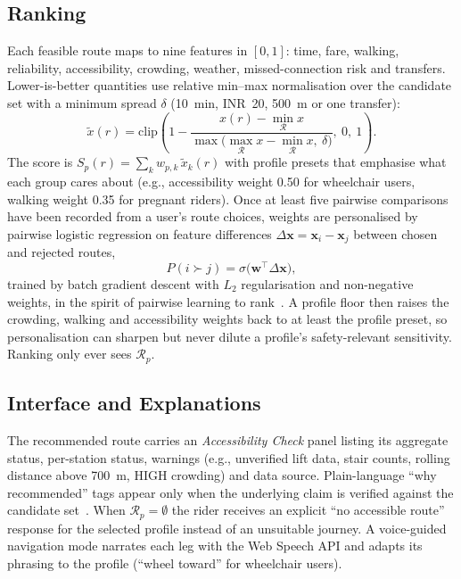 \documentclass[conference]{IEEEtran}
\begin{document}
\subsection{Ranking}
Each feasible route maps to nine features in $[0,1]$: time, fare, walking, reliability, accessibility, crowding, weather, missed-connection risk and transfers. Lower-is-better quantities use relative min--max normalisation over the candidate set with a minimum spread $\delta$ (10~min, INR~20, 500~m or one transfer):
\begin{equation}
\tilde{x}(r) = \mathrm{clip}\!\left(1 - \frac{x(r) - \min_{\mathcal{R}} x}{\max\bigl(\max_{\mathcal{R}} x - \min_{\mathcal{R}} x,\ \delta\bigr)},\ 0,\ 1\right).
\label{eq:norm}
\end{equation}
The score is $S_p(r) = \sum_k w_{p,k}\,\tilde{x}_k(r)$ with profile presets that emphasise what each group cares about (e.g., accessibility weight 0.50 for wheelchair users, walking weight 0.35 for pregnant riders). Once at least five pairwise comparisons have been recorded from a user's route choices, weights are personalised by pairwise logistic regression on feature differences $\Delta\mathbf{x} = \mathbf{x}_i - \mathbf{x}_j$ between chosen and rejected routes,
\begin{equation}
P(i \succ j) = \sigma\bigl(\mathbf{w}^{\top}\Delta\mathbf{x}\bigr),
\label{eq:pairwise}
\end{equation}
trained by batch gradient descent with $L_2$ regularisation and non-negative weights, in the spirit of pairwise learning to rank~\cite{koppel2025ranknet}. A profile floor then raises the crowding, walking and accessibility weights back to at least the profile preset, so personalisation can sharpen but never dilute a profile's safety-relevant sensitivity. Ranking only ever sees $\mathcal{R}_p$.

\subsection{Interface and Explanations}
The recommended route carries an \emph{Accessibility Check} panel listing its aggregate status, per-station status, warnings (e.g., unverified lift data, stair counts, rolling distance above 700~m, HIGH crowding) and data source. Plain-language ``why recommended'' tags appear only when the underlying claim is verified against the candidate set~\cite{wardatzky2025explanations}. When $\mathcal{R}_p = \emptyset$ the rider receives an explicit ``no accessible route'' response for the selected profile instead of an unsuitable journey. A voice-guided navigation mode narrates each leg with the Web Speech API and adapts its phrasing to the profile (``wheel toward'' for wheelchair users).
\end{document}
